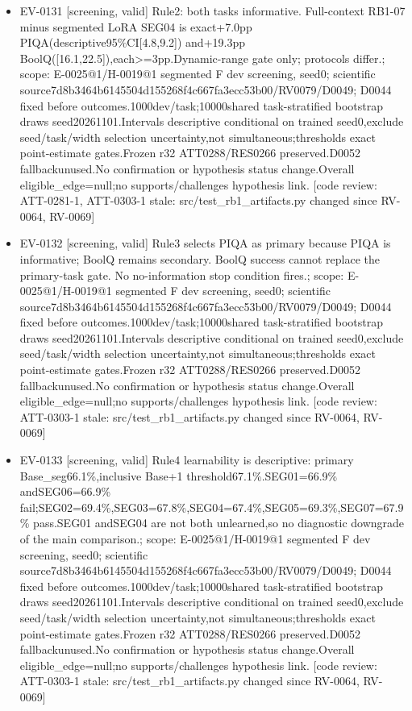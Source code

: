 \documentclass[11pt]{article}
\begin{document}
\begin{itemize}
\item EV-0131 [screening, valid] Rule2: both tasks informative. Full-context RB1-07 minus segmented LoRA SEG04 is exact+7.0pp PIQA(descriptive95\%CI[4.8,9.2]) and+19.3pp BoolQ([16.1,22.5]),each\textgreater{}=3pp.Dynamic-range gate only; protocols differ.; scope: E-0025@1/H-0019@1 segmented F dev screening, seed0; scientific source7d8b3464b6145504d155268f4c667fa3ecc53b00/RV0079/D0049; D0044 fixed before outcomes.1000dev/task;10000shared task-stratified bootstrap draws seed20261101.Intervals descriptive conditional on trained seed0,exclude seed/task/width selection uncertainty,not simultaneous;thresholds exact point-estimate gates.Frozen r32 ATT0288/RES0266 preserved.D0052 fallbackunused.No confirmation or hypothesis status change.Overall eligible\_edge=null;no supports/challenges hypothesis link. [code review: ATT-0281-1, ATT-0303-1 stale: src/test\_rb1\_artifacts.py changed since RV-0064, RV-0069]
\item EV-0132 [screening, valid] Rule3 selects PIQA as primary because PIQA is informative; BoolQ remains secondary. BoolQ success cannot replace the primary-task gate. No no-information stop condition fires.; scope: E-0025@1/H-0019@1 segmented F dev screening, seed0; scientific source7d8b3464b6145504d155268f4c667fa3ecc53b00/RV0079/D0049; D0044 fixed before outcomes.1000dev/task;10000shared task-stratified bootstrap draws seed20261101.Intervals descriptive conditional on trained seed0,exclude seed/task/width selection uncertainty,not simultaneous;thresholds exact point-estimate gates.Frozen r32 ATT0288/RES0266 preserved.D0052 fallbackunused.No confirmation or hypothesis status change.Overall eligible\_edge=null;no supports/challenges hypothesis link. [code review: ATT-0303-1 stale: src/test\_rb1\_artifacts.py changed since RV-0064, RV-0069]
\item EV-0133 [screening, valid] Rule4 learnability is descriptive: primary Base\_seg66.1\%,inclusive Base+1 threshold67.1\%.SEG01=66.9\% andSEG06=66.9\% fail;SEG02=69.4\%,SEG03=67.8\%,SEG04=67.4\%,SEG05=69.3\%,SEG07=67.9\% pass.SEG01 andSEG04 are not both unlearned,so no diagnostic downgrade of the main comparison.; scope: E-0025@1/H-0019@1 segmented F dev screening, seed0; scientific source7d8b3464b6145504d155268f4c667fa3ecc53b00/RV0079/D0049; D0044 fixed before outcomes.1000dev/task;10000shared task-stratified bootstrap draws seed20261101.Intervals descriptive conditional on trained seed0,exclude seed/task/width selection uncertainty,not simultaneous;thresholds exact point-estimate gates.Frozen r32 ATT0288/RES0266 preserved.D0052 fallbackunused.No confirmation or hypothesis status change.Overall eligible\_edge=null;no supports/challenges hypothesis link. [code review: ATT-0303-1 stale: src/test\_rb1\_artifacts.py changed since RV-0064, RV-0069]

\end{itemize}
\end{document}
